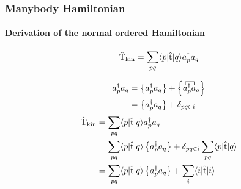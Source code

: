 \begin{frame}[fragile]
    \frametitle{Manybody Hamiltonian}
    \framesubtitle{Derivation of the normal ordered Hamiltonian}

    \begin{equation*}
        \hat{\mathrm{T}}_{\mathrm{kin}} = \sum_{pq} \langle p | \hat{\mathrm{t}} |q\rangle a^\dagger_p a_q
    \end{equation*}

    \begin{align*}
        a^\dagger_p a_q &= \left\{a^\dagger_p a_q\right\} + \left\{ 
    \contraction{}{a}{{}^{\dagger}_p}{a}
    a^\dagger_p a_q
    \right\} \nn
        &= \left\{a^\dagger_p a_q\right\} + \delta_{pq\in i}
    \end{align*}
    \begin{align*}
        \hat{\mathrm{T}}_{\mathrm{kin}} &= \sum_{pq} \langle p |\hat{\mathrm{t}}|q\rangle a^\dagger_p a_q \notag \\
            &= \sum_{pq} \langle p |\hat{\mathrm{t}}|q\rangle \left\{a^\dagger_p a_q\right\} + 
                \delta_{pq\in i} \sum_{pq} \langle p |\hat{\mathrm{t}}|q\rangle \notag \\
            &= \sum_{pq} \langle p |\hat{\mathrm{t}}|q\rangle \left\{a^\dagger_p a_q\right\} +
                \sum_i \langle i |\hat{\mathrm{t}}|i\rangle
    \end{align*}

\end{frame}
